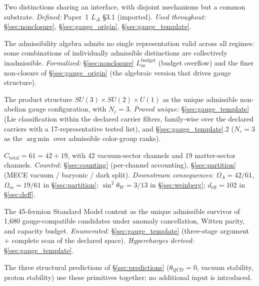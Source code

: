 \documentclass[11pt]{article}
\DeclareMathOperator*{\argmin}{arg\,min}
\begin{document}
\begin{tcolorbox}[apfbox, title={Operational primitives: where each structural term is defined and used}]
\begin{description}[topsep=2pt,itemsep=2pt]
  \item[Co-located distinctions.]  Two distinctions sharing an interface, with disjoint mechanisms but a common substrate.  \emph{Defined:} Paper~1 $L_\Delta$ \S 3.1 (imported).  \emph{Used throughout:} \S\ref{sec:nonclosure}, \S\ref{sec:gauge_origin}, \S\ref{sec:gauge_template}.
  \item[Non-closure.]  The admissibility algebra admits no single representation valid across all regimes: some combinations of individually admissible distinctions are collectively inadmissible.  \emph{Formalized:} \S\ref{sec:nonclosure} $L_{\mathrm{nc}}^{\mathrm{budget}}$ (budget overflow) and the finer non-closure of \S\ref{sec:gauge_origin} (the algebraic version that drives gauge structure).
  \item[Gauge template.]  The product structure $SU(3)\times SU(2)\times U(1)$ as the unique admissible non-abelian gauge configuration, with $N_c = 3$.  \emph{Proved unique:} \S\ref{sec:gauge_template} (Lie classification within the declared carrier filters, family-wise over the declared carriers with a 17-representative tested list), and \S\ref{sec:gauge_template}.2 ($N_c = 3$ as the $\argmin$ over admissible color-group ranks).
  \item[Capacity partition.]  $C_{\mathrm{total}} = 61 = 42 + 19$, with 42 vacuum-sector channels and 19 matter-sector channels.  \emph{Counted:} \S\ref{sec:counting} (per-channel accounting), \S\ref{sec:partition} (MECE vacuum / baryonic / dark split).  \emph{Downstream consequences:} $\Omega_\Lambda = 42/61$, $\Omega_m = 19/61$ in \S\ref{sec:partition}; $\sin^2\theta_W = 3/13$ in \S\ref{sec:weinberg}; $d_{\mathrm{eff}} = 102$ in \S\ref{sec:deff}.
  \item[Fermion template.]  The 45-fermion Standard Model content as the unique admissible survivor of 1{,}680 gauge-compatible candidates under anomaly cancellation, Witten parity, and capacity budget.  \emph{Enumerated:} \S\ref{sec:gauge_template} (three-stage argument + complete scan of the declared space).  \emph{Hypercharges derived:} \S\ref{sec:gauge_template}.
\end{description}

\noindent The three structural predictions of \S\ref{sec:predictions} ($\theta_{\mathrm{QCD}} = 0$, vacuum stability, proton stability) use these primitives together; no additional input is introduced.
\end{tcolorbox}
\end{document}
